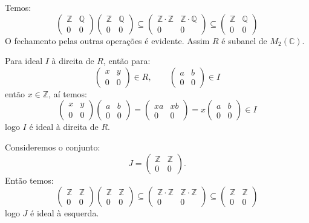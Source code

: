 \documentclass[10pt,a4paper]{article}
\begin{document}
Temos:
\[
\begin{pmatrix}
\mathbb{Z}&\mathbb{Q}\\0&0
\end{pmatrix}\begin{pmatrix}
\mathbb{Z}&\mathbb{Q}\\0&0
\end{pmatrix}\subseteq\begin{pmatrix}
\mathbb{Z}\cdot\mathbb{Z}&\mathbb{Z}\cdot\mathbb{Q}\\0&0
\end{pmatrix}\subseteq\begin{pmatrix}
\mathbb{Z}&\mathbb{Q}\\0&0
\end{pmatrix}
\]
O fechamento pelas outras operações é evidente. Assim $R$ é subanel de $M_2(\mathbb{C})$.

\medskip
\noindent
Para ideal $I$ à direita de $R$, então para:
\[
\begin{pmatrix}
x&y\\0&0
\end{pmatrix}\in R,\quad\quad\begin{pmatrix}
a&b\\0&0
\end{pmatrix}\in I
\]
então $x\in\mathbb{Z}$, aí temos:
\[
\begin{pmatrix}
x&y\\0&0
\end{pmatrix}\begin{pmatrix}
a&b\\0&0
\end{pmatrix}=\begin{pmatrix}
xa&xb\\0&0
\end{pmatrix}=x\begin{pmatrix}
a&b\\0&0
\end{pmatrix}\in I
\]
logo $I$ é ideal à direita de $R$.

\medskip
\noindent
Consideremos o conjunto:
\[
J=\begin{pmatrix}
\mathbb{Z}&\mathbb{Z}\\0&0
\end{pmatrix}.
\]
Então temos:
\[
\begin{pmatrix}
\mathbb{Z}&\mathbb{Z}\\0&0
\end{pmatrix}\begin{pmatrix}
\mathbb{Z}&\mathbb{Z}\\0&0
\end{pmatrix}\subseteq
\begin{pmatrix}
\mathbb{Z}\cdot\mathbb{Z}&\mathbb{Z}\cdot\mathbb{Z}\\0&0
\end{pmatrix}\subseteq
\begin{pmatrix}
\mathbb{Z}&\mathbb{Z}\\0&0
\end{pmatrix}
\]
logo $J$ é ideal à esquerda.
\end{document}
